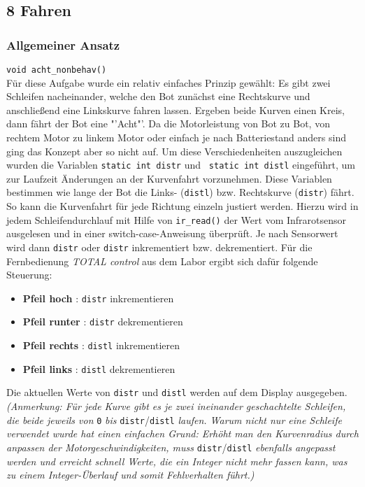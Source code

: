 \subsection{8 Fahren}
\label{8-fahren}

\subsubsection{Allgemeiner Ansatz}
\noindent \verb+void acht_nonbehav()+ \\

Für diese Aufgabe wurde ein relativ einfaches Prinzip gewählt: Es gibt zwei Schleifen nacheinander, welche den Bot zunächst eine Rechtskurve und anschließend eine Linkskurve fahren lassen. Ergeben beide Kurven einen Kreis, dann fährt der Bot eine "'Acht"'. Da die Motorleistung von Bot zu Bot, von rechtem Motor zu linkem Motor oder einfach je nach Batteriestand anders sind ging das Konzept aber so nicht auf.
Um diese Verschiedenheiten auszugleichen wurden die Variablen \verb+static int distr+ und \verb+ static int distl+ eingeführt, um zur Laufzeit Änderungen an der Kurvenfahrt vorzunehmen. Diese Variablen bestimmen wie lange der Bot die Links- (\verb+distl+) bzw. Rechtskurve (\verb+distr+) fährt. So kann die Kurvenfahrt für jede Richtung einzeln justiert werden. 
Hierzu wird in jedem Schleifendurchlauf mit Hilfe von \verb+ir_read()+ der Wert vom Infrarotsensor ausgelesen und in einer switch-case-Anweisung überprüft. Je nach Sensorwert wird dann \verb+distr+ oder \verb+distr+ inkrementiert bzw. dekrementiert. Für die Fernbedienung \textit{TOTAL control} aus dem Labor ergibt sich dafür folgende Steuerung:
\begin{itemize}
	\item \textbf{Pfeil hoch}   : \verb_distr_  inkrementieren
	\item \textbf{Pfeil runter} : \verb_distr_  dekrementieren
	\item \textbf{Pfeil rechts} : \verb_distl_  inkrementieren
	\item \textbf{Pfeil links}  : \verb_distl_  dekrementieren
\end{itemize}

\noindent Die aktuellen Werte von \verb+distr+ und \verb+distl+ werden auf dem Display ausgegeben.\\

\textit{(Anmerkung: Für jede Kurve gibt es je zwei ineinander geschachtelte Schleifen, die beide jeweils von }\verb+0+\textit{ bis }\verb+distr+/\verb+distl+\textit{ laufen. Warum nicht nur eine Schleife verwendet wurde hat einen einfachen Grund: Erhöht man den Kurvenradius durch anpassen der Motorgeschwindigkeiten, muss }\verb+distr+/\verb+distl+\textit{ ebenfalls angepasst werden und erreicht schnell Werte, die ein Integer nicht mehr fassen kann, was zu einem Integer-Überlauf und somit Fehlverhalten führt.)}

